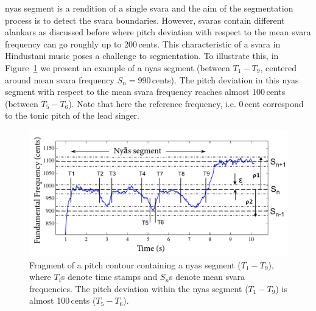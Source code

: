 {\Gls{nyas} segment is a rendition of a single \gls{svara} and the aim of the segmentation process is to detect the \gls{svara} boundaries. However, \glspl{svara} contain different \glspl{alankar} as discussed before where pitch deviation with respect to the mean \gls{svara} frequency can go roughly up to 200\,cents. This characteristic of a \gls{svara} in Hindustani music poses a challenge to segmentation. To illustrate this, in Figure~\ref{fig:nyas_segmentation_illustration} we present an example of a \gls{nyas} segment (between $T_1-T_9$, centered around mean \gls{svara} frequency $S_n=990$\,cents). The pitch deviation in this \gls{nyas} segment with respect to the mean \gls{svara} frequency reaches almost 100\,cents (between $T_5-T_6$). Note that here the reference frequency, i.e. 0\,cent correspond to the tonic pitch of the lead singer.

\begin{figure}
	\begin{center}
		\includegraphics[width=\figSizeNinety]{ch05_preprocessing/figures/NyasSegmentationMethod.pdf}
	\end{center}
	\caption{Fragment of a pitch contour containing a \gls{nyas} segment ($T_1-T_9$), where $T_i$s denote time stamps and $S_n$s denote mean \gls{svara} frequencies. The pitch deviation within the \gls{nyas} segment ($T_1-T_9$) is almost 100\,cents ($T_5-T_6$).}
	\label{fig:nyas_segmentation_illustration}
\end{figure}

}
